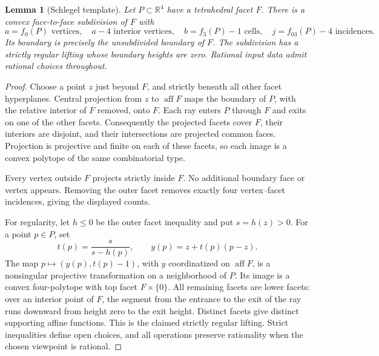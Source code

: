 \documentclass[11pt,a4paper]{article}
\newtheorem{lemma}[theorem]{Lemma}
\theoremstyle{definition}\newtheorem{definition}[theorem]{Definition}
\theoremstyle{remark}\newtheorem{remark}[theorem]{Remark}
\newcommand{\R}{\mathbb R}\newcommand{\Z}{\mathbb Z}\newcommand{\conv}{\operatorname{conv}}
\DeclareMathOperator{\aff}{aff}\DeclareMathOperator{\relint}{relint}
\begin{document}
\begin{lemma}[Schlegel template]\label{lem:schlegel}
Let \(P\subset\R^4\) have a tetrahedral facet \(F\). There is a convex face-to-face subdivision of \(F\) with
\[
 a=f_0(P)\text{ vertices},\quad a-4\text{ interior vertices},\quad
 b=f_3(P)-1\text{ cells},\quad j=f_{03}(P)-4\text{ incidences}.
\]
Its boundary is precisely the unsubdivided boundary of \(F\). The subdivision has a strictly regular lifting whose boundary heights are zero. Rational input data admit rational choices throughout.
\end{lemma}
\begin{proof}
Choose a point \(z\) just beyond \(F\), and strictly beneath all other facet hyperplanes. Central projection from \(z\) to \(\aff F\) maps the boundary of \(P\), with the relative interior of \(F\) removed, onto \(F\). Each ray enters \(P\) through \(F\) and exits on one of the other facets. Consequently the projected facets cover \(F\), their interiors are disjoint, and their intersections are projected common faces. Projection is projective and finite on each of these facets, so each image is a convex polytope of the same combinatorial type.

Every vertex outside \(F\) projects strictly inside \(F\). No additional boundary face or vertex appears. Removing the outer facet removes exactly four vertex--facet incidences, giving the displayed counts.

For regularity, let \(h\le0\) be the outer facet inequality and put \(s=h(z)>0\). For a point \(p\in P\), set
\[
 t(p)=\frac{s}{s-h(p)},\qquad y(p)=z+t(p)(p-z).
\]
The map \(p\mapsto(y(p),t(p)-1)\), with \(y\) coordinatized on \(\aff F\), is a nonsingular projective transformation on a neighborhood of \(P\). Its image is a convex four-polytope with top facet \(F\times\{0\}\). All remaining facets are lower facets: over an interior point of \(F\), the segment from the entrance to the exit of the ray runs downward from height zero to the exit height. Distinct facets give distinct supporting affine functions. This is the claimed strictly regular lifting. Strict inequalities define open choices, and all operations preserve rationality when the chosen viewpoint is rational.
\end{proof}
\end{document}
